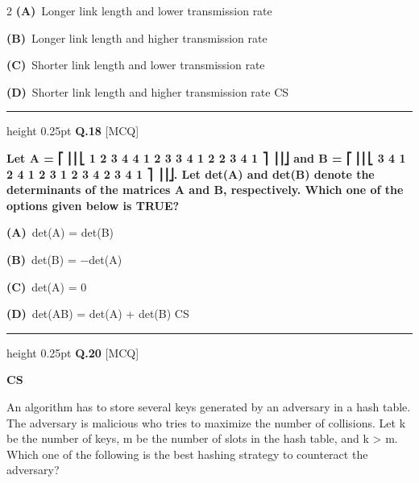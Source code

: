 \documentclass[a4paper,10pt,twoside]{article}
\begin{document}
\begin{multicols}{2}
\textbf{(A)}~Longer link length and lower transmission rate\par\vspace{2pt}\noindent
\textbf{(B)}~Longer link length and higher transmission rate\par\vspace{2pt}\noindent
\textbf{(C)}~Shorter link length and lower transmission rate\par\vspace{2pt}\noindent
\textbf{(D)}~Shorter link length and higher transmission rate \newline CS
\par\vspace{6pt}\hrule height 0.25pt\vspace{6pt}
\noindent\textbf{Q.18} \hfill {\footnotesize\textsf{[MCQ]}}
\par\vspace{2pt}
{\bfseries Let
A =
⎡
⎢⎢⎣
1
2
3
4
4
1
2
3
3
4
1
2
2
3
4
1
⎤
⎥⎥⎦
and
B =
⎡
⎢⎢⎣
3
4
1
2
4
1
2
3
1
2
3
4
2
3
4
1
⎤
⎥⎥⎦.
Let det(A) and det(B) denote the determinants of the matrices A and B,
respectively.
Which one of the options given below is TRUE? \par}
\par\vspace{2pt}\noindent
\textbf{(A)}~det(A) = det(B)\par\vspace{2pt}\noindent
\textbf{(B)}~det(B) = −det(A)\par\vspace{2pt}\noindent
\textbf{(C)}~det(A) = 0\par\vspace{2pt}\noindent
\textbf{(D)}~det(AB) = det(A) + det(B) \newline CS
\par\vspace{6pt}\hrule height 0.25pt\vspace{6pt}
\noindent\textbf{Q.20} \hfill {\footnotesize\textsf{[MCQ]}}
\par\vspace{2pt}
{\bfseries CS
\par\smallskip
An algorithm has to store several keys generated by an adversary in a hash
table. The adversary is malicious who tries to maximize the number of collisions.
Let k be the number of keys, m be the number of slots in the hash table, and k > m.
Which one of the following is the best hashing strategy to counteract the adversary? \par}
\par\vspace{2pt}\noindent

\end{multicols}
\end{document}
